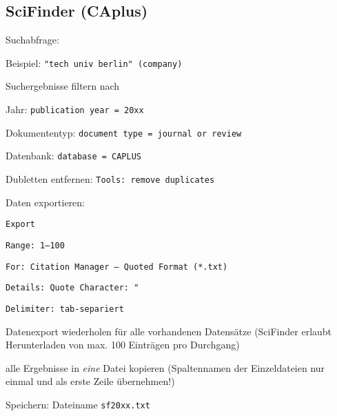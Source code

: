 \subsection*{SciFinder (CAplus)}
\begin{compactitem}
\item Suchabfrage:
	\begin{compactitem}
    \item Beispiel: \texttt{"{}tech univ berlin"{} (company)}
    \end{compactitem}
\item Suchergebnisse filtern nach
	\begin{compactitem}
    \item Jahr: \texttt{publication year = 20xx}
    \item Dokumententyp: \texttt{document type = journal or review}
    \item Datenbank: \texttt{database = CAPLUS}
    \end{compactitem}
\item Dubletten entfernen: \texttt{Tools: remove duplicates}
\item Daten exportieren: 
	\begin{compactitem}
    \item \texttt{Export}
    \item \texttt{Range: 1--100}
    \item \texttt{For: Citation Manager -- Quoted Format (*.txt)}
    \item \texttt{Details: Quote Character: "}
    \item \texttt{Delimiter: tab-separiert}
    \end{compactitem}
\item Datenexport wiederholen für alle vorhandenen Datensätze (SciFinder erlaubt Herunterladen von max. 100 Einträgen pro Durchgang)
\item alle Ergebnisse in \textit{eine} Datei kopieren (Spaltennamen der Einzeldateien nur einmal und als erste Zeile übernehmen!)
\item Speichern: Dateiname \texttt{sf20xx.txt}
\end{compactitem}

